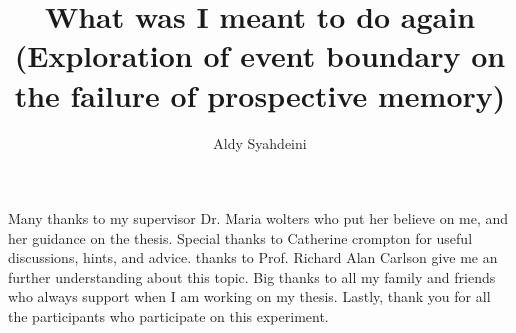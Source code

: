 \documentclass[msc,frontabs,logo,twoside,deptreport]{infthesis}
\title{What was I meant to do again (Exploration of event boundary on the failure of prospective memory)}
\author{Aldy Syahdeini}
\begin{document}
\begin{preliminary}

\maketitle

\begin{acknowledgements}
Many thanks to my supervisor Dr. Maria wolters who put her believe on me, and her guidance
on the thesis.
Special thanks to Catherine crompton for useful discussions, hints, and
advice.
thanks to Prof. Richard Alan Carlson give me an further understanding about this topic.
Big thanks to all my family and friends who always support when I am working on my thesis.
Lastly, thank you for all the participants who participate on this experiment.


\end{acknowledgements}

\standarddeclaration


\tableofcontents


\end{preliminary}









% 

\appendix












\end{document}
